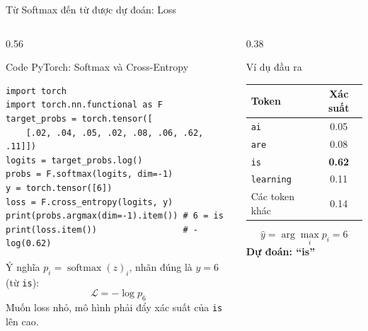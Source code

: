 \documentclass[aspectratio=169, 10pt]{beamer}
\begin{document}
\begin{frame}[fragile]{Từ Softmax đến từ được dự đoán: Loss}
\begin{columns}[T]
\begin{column}{0.56\textwidth}
\begin{block}{Code PyTorch: Softmax và Cross-Entropy}
\begin{lstlisting}[style=rnnpython]
import torch
import torch.nn.functional as F
target_probs = torch.tensor([
    [.02, .04, .05, .02, .08, .06, .62, .11]])
logits = target_probs.log()
probs = F.softmax(logits, dim=-1)
y = torch.tensor([6])
loss = F.cross_entropy(logits, y)
print(probs.argmax(dim=-1).item()) # 6 = is
print(loss.item())                 # -log(0.62)
\end{lstlisting}
\end{block}

\begin{alertblock}{Ý nghĩa}
\scriptsize
\(p_i=\operatorname{softmax}(z)_i\), nhãn đúng là \(y=6\) (từ \texttt{is}):
\[
\mathcal{L}=-\log p_{6}
\]
Muốn loss nhỏ, mô hình phải đẩy xác suất của \texttt{is} lên cao.
\end{alertblock}
\end{column}

\begin{column}{0.38\textwidth}
\begin{exampleblock}{Ví dụ đầu ra}
\scriptsize
\begin{tabular}{l c}
\toprule
Token & Xác suất \\
\midrule
\texttt{ai} & 0.05 \\
\texttt{are} & 0.08 \\
\texttt{is} & \textbf{0.62} \\
\texttt{learning} & 0.11 \\
Các token khác & 0.14 \\
\bottomrule
\end{tabular}

\vspace{0.2cm}
\[
\hat{y}=\arg\max_i p_i=6
\]
\centering
\textbf{Dự đoán: ``is''}
\end{exampleblock}
\end{column}
\end{columns}
\end{frame}
\end{document}
